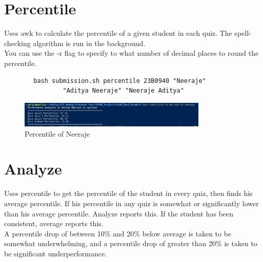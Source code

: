 \documentclass{article}
\begin{document}
    \section{Percentile}
    Uses awk to calculate the percentile of a given student in each quiz. The spell-checking algorithm is run in the background.\\
    You can use the -r flag to specify to what number of decimal places to round the percentile.\\
    \begin{lstlisting}
        bash submission.sh percentile 23B0940 "Neeraje" 
                "Aditya Neeraje" "Neeraje Aditya"
    \end{lstlisting}
    \begin{figure}[htbp]
        \centering
        \includegraphics[width=0.8\textwidth]{Neeraje_percentile.png}
        \caption{Percentile of Neeraje}
        \label{fig:percentile}
    \end{figure}

    \section{Analyze}
    Uses percentile to get the percentile of the student in every quiz, then finds his average percentile. If his percentile in any quiz is somewhat or significantly lower than his average percentile. Analyze reports this. If the student has been consistent, average reports this.\\
    A percentile drop of between 10\% and 20\% below average is taken to be somewhat underwhelming, and a percentile drop of greater than 20\% is taken to be significant underperformance.
\end{document}
